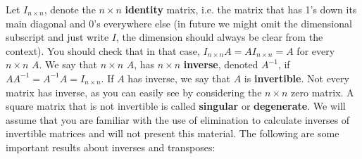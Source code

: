 \documentclass[12pt,oneside]{article}
\begin{document}
Let $I_{n \times n}$, denote the $n \times n$ \textbf{identity}
matrix, i.e. the matrix that has 1's down its main diagonal and 0's
everywhere else (in future we might omit the dimensional subscript and
just write $I$, the dimension should always be clear from the
context). You should check that in that case, $I_{n \times n} A = A
I_{n \times n} = A$ for every $n \times n$ $A$. We say that $n \times
n$ $A$, has $n \times n$ \textbf{inverse}, denoted $A^{-1}$, if $A
A^{-1} = A^{-1} A = I_{n \times n}$.  If $A$ has inverse, we say that
$A$ is \textbf{invertible}. Not every matrix has inverse, as you can
easily see by considering the $n \times n$ zero matrix. A square matrix 
that is not invertible is called \textbf{singular} or \textbf{degenerate}. We 
will assume that you are familiar with the use of elimination to calculate
inverses of invertible matrices and will not present this
material. The following are some important results about inverses and
transposes:
\end{document}
